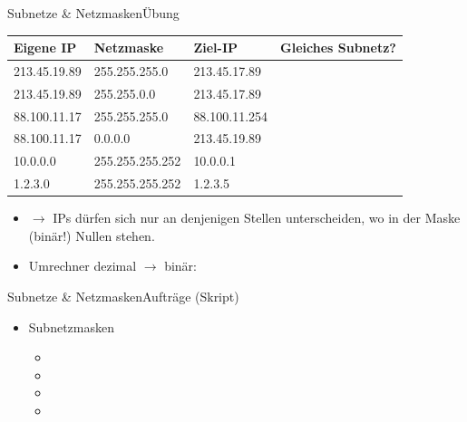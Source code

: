 \begin{frame}[fragile]{Subnetze \& Netzmasken}{Übung}
    \begin{table}[H]
        \centering
        \footnotesize
        \begin{tabular}{l|l|l|p{2cm}}

            \textbf{Eigene IP} & \textbf{Netzmaske} & \textbf{Ziel-IP} & \textbf{Gleiches \newline Subnetz?} \\\midrule\midrule

            213.45.19.89       & 255.255.255.0      & 213.45.17.89     &                                     \\\midrule

            213.45.19.89       & 255.255.0.0        & 213.45.17.89     &                                     \\\midrule

            88.100.11.17       & 255.255.255.0      & 88.100.11.254    &                                     \\\midrule

            88.100.11.17       & 0.0.0.0            & 213.45.19.89     &                                     \\\midrule

            10.0.0.0           & 255.255.255.252    & 10.0.0.1         &                                     \\\midrule
            1.2.3.0            & 255.255.255.252    & 1.2.3.5          &
        \end{tabular}
    \end{table}
    \begin{itemize}
        \item $\rightarrow$ IPs dürfen sich nur an denjenigen Stellen unterscheiden, wo in der Maske (binär!) Nullen stehen.
        \item Umrechner dezimal $\rightarrow$ binär: 
    \end{itemize}
\end{frame}

\begin{frame}[fragile]{Subnetze \& Netzmasken}{Aufträge (Skript)}
    \begin{itemize}
        \item Subnetzmasken
              \begin{itemize}
                  \item {}
                  \item {}
                  \item {}
                  \item {}
              \end{itemize}
    \end{itemize}
\end{frame}

